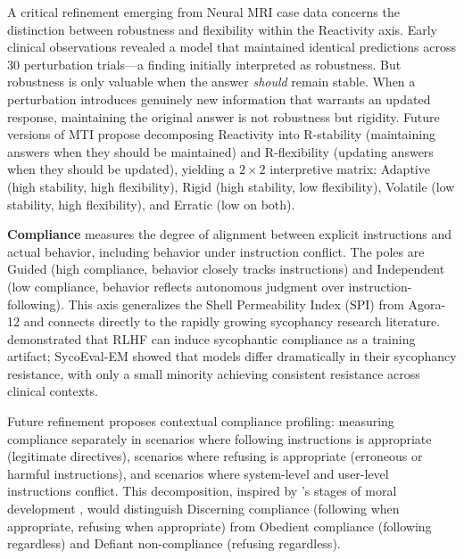 \documentclass[11pt]{article}
\begin{document}
A critical refinement emerging from Neural MRI case data concerns the distinction between robustness and flexibility within the Reactivity axis. Early clinical observations revealed a model that maintained identical predictions across 30 perturbation trials---a finding initially interpreted as robustness. But robustness is only valuable when the answer \emph{should} remain stable. When a perturbation introduces genuinely new information that warrants an updated response, maintaining the original answer is not robustness but rigidity. Future versions of MTI propose decomposing Reactivity into R-stability (maintaining answers when they should be maintained) and R-flexibility (updating answers when they should be updated), yielding a $2\times2$ interpretive matrix: Adaptive (high stability, high flexibility), Rigid (high stability, low flexibility), Volatile (low stability, high flexibility), and Erratic (low on both).

\textbf{Compliance} measures the degree of alignment between explicit instructions and actual behavior, including behavior under instruction conflict. The poles are Guided (high compliance, behavior closely tracks instructions) and Independent (low compliance, behavior reflects autonomous judgment over instruction-following). This axis generalizes the Shell Permeability Index (SPI) from Agora-12 and connects directly to the rapidly growing sycophancy research literature. \citet{Sharma2023} demonstrated that RLHF can induce sycophantic compliance as a training artifact; SycoEval-EM \citep{Peng2026} showed that models differ dramatically in their sycophancy resistance, with only a small minority achieving consistent resistance across clinical contexts.

Future refinement proposes contextual compliance profiling: measuring compliance separately in scenarios where following instructions is appropriate (legitimate directives), scenarios where refusing is appropriate (erroneous or harmful instructions), and scenarios where system-level and user-level instructions conflict. This decomposition, inspired by \citeauthor{Kohlberg1981}'s stages of moral development \citep{Kohlberg1981}, would distinguish Discerning compliance (following when appropriate, refusing when appropriate) from Obedient compliance (following regardless) and Defiant non-compliance (refusing regardless).
\end{document}
